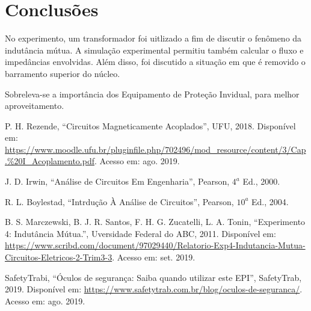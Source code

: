 \documentclass[a4paper,12pt,oneside,openany,table,xcdraw]{article}
\begin{document}
\section{Conclusões} %
No experimento, um transformador foi uitlizado a fim de discutir o fenômeno da indutância mútua. A simulação experimental permitiu também calcular o fluxo e impedâncias envolvidas. Além disso, foi discutido a situação em que é removido o barramento superior do núcleo. 

Sobreleva-se a importância dos Equipamento de Proteção Invidual, para melhor aproveitamento.

\newpage
\begin{thebibliography}{9} 
    P. H. Rezende,
    “Circuitos Magneticamente Acoplados”, UFU, 2018.
 Disponível em:
 \url{https://www.moodle.ufu.br/pluginfile.php/702496/mod_resource/content/3/Cap.\%20I_Acoplamento.pdf}. Acesso em: ago. 2019.

    J. D. Irwin,
    “Análise de Circuitos Em Engenharia”, Pearson, $4^a$ Ed., 2000.

    R. L. Boylestad,
    “Intrdução À Análise de Circuitos”, Pearson, $10^a$ Ed., 2004.

    B. S. Marczewski, B. J. R. Santos, F. H. G. Zucatelli, L. A. Tonin,
    “Experimento 4: Indutância Mútua.”, Uversidade Federal do ABC, 2011.
 Disponível em:
 \url{https://www.scribd.com/document/97029440/Relatorio-Exp4-Indutancia-Mutua-Circuitos-Eletricos-2-Trim3-3}. Acesso em: set. 2019.

    SafetyTrabi,
    “Óculos de segurança: Saiba quando utilizar este EPI”, SafetyTrab, 2019.
 Disponível em:
 \url{https://www.safetytrab.com.br/blog/oculos-de-seguranca/}. Acesso em: ago. 2019.


\end{thebibliography}
\end{document}
